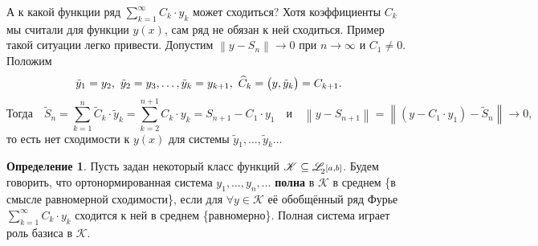 \documentclass[12pt,a4paper,openany,fleqn]{book}
\newcommand{\fL}[1][{[a,b]}]{\ensuremath{\mathscr{L}\hspace*{-0.11 cm}{\mathstrut}_{2}\scriptstyle#1}}
\newcommand{\norm}[1]{\ensuremath{\left\|#1\right\|}}
\theoremstyle{definition}
\newtheorem{_def}{Определение}[section]
\begin{document}
	А к какой функции ряд $\sum\limits_{k=1}^{\infty}C_k\cdot y_k$ может сходиться? Хотя коэффициенты $C_k$ мы считали для функции $y(x)$, сам ряд не обязан к ней сходиться. Пример такой ситуации легко привести. Допустим $\norm{y-S_n}\to0$ при $n\to\infty$ и $C_1\neq0$. Положим
	\begin{equation*}
		\hfill \tilde{y}_1=y_2,\ \tilde{y}_2=y_3,\ldots,\tilde{y}_k=y_{k+1},\ \widehat{C}_k=\big(y,\tilde{y}_k\big)=C_{k+1}.\hfill
	\end{equation*}
	\begin{equation*}
		\text{Тогда}\quad\widetilde{S}_n=\sum\limits_{k=1}^n \widetilde{C}_k\cdot \tilde{y}_k=\sum\limits_{k=2}^{n+1}C_k\cdot y_k=S_{n+1}-C_1\cdot y_1\quad\text{и}\quad\norm{y-S_{n+1}}=\norm{(y-C_1\cdot y_1)-\widetilde{S}_n}\to0,
	\end{equation*}
	то есть нет сходимости к $y(x)$ для системы $\tilde{y}_1,\ldots,\tilde{y}_k\ldots$
	
	\begin{_def}
		Пусть задан некоторый класс функций $\mathscr{K}\subseteq\fL$. Будем говорить, что ортонормированная система $y_1,\ldots,y_n,\ldots$ \textbf{полна} в $\mathscr{K}$ в среднем \{в смысле равномерной сходимости\}, если для $\forall y\in\mathscr{K}$ её обобщённый ряд Фурье $\sum\limits_{k=1}^{\infty}C_k\cdot y_k$ сходится к ней в среднем \{равномерно\}. Полная система играет роль базиса в $\mathscr{K}$.
	\end{_def}
	
\end{document}
